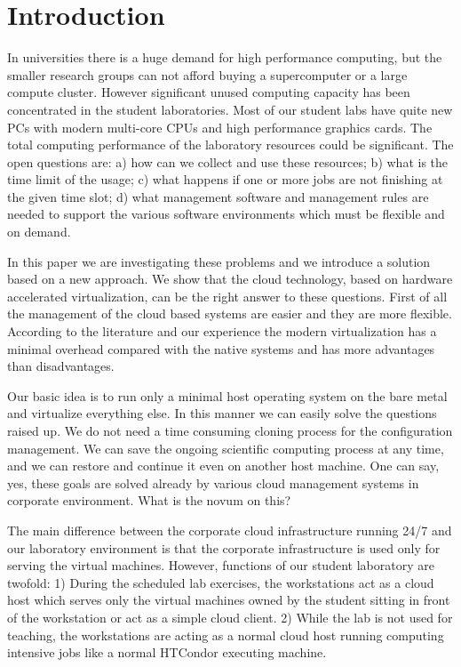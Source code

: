 \documentclass{llncs}
\begin{document}
\section{Introduction}
In universities there is a huge demand for high performance computing, but the smaller research groups can not afford buying a supercomputer or a large compute cluster. However significant unused computing capacity has been concentrated in the student laboratories. Most of our student labs have quite new PCs with modern multi-core CPUs and high performance graphics cards. The total computing performance of the laboratory resources could be significant. The open questions are: a) how can we collect and use these resources; b) what is the time limit of the usage; c) what happens if one or more jobs are not finishing at the given time slot; d) what management software and management rules are needed to support the various software environments which must be flexible and on demand. 

In this paper we are investigating these problems and we introduce a solution based on a new approach. We show that the cloud technology, based on hardware accelerated virtualization, can be the right answer to these questions. First of all the management of the cloud based systems are easier and they are more flexible. According to the literature\cite{younge2011analysis} and our experience the modern virtualization has a minimal overhead compared with the native systems and has more advantages than disadvantages.

Our basic idea is to run only a minimal host operating system on the bare metal and virtualize everything else. In this manner we can easily solve the questions raised up. We do not need a time consuming cloning process for the configuration management. We can save the ongoing scientific computing process at any time, and we can restore and continue it  even on another host machine. One can say, yes, these goals are solved already by various cloud management systems in corporate environment. What is the novum on this? 

The main difference between the  corporate cloud infrastructure running 24/7 and our laboratory environment is that the corporate infrastructure is used only for serving the virtual machines. However, functions of our student laboratory are twofold:  1) During the scheduled lab exercises, the workstations act as a cloud host which serves only the virtual machines owned by the student sitting in front of the workstation or act as a simple cloud client. 2) While the lab is not used for teaching, the workstations are acting as a normal cloud host running computing intensive jobs like a normal HTCondor executing machine. 
\end{document}
